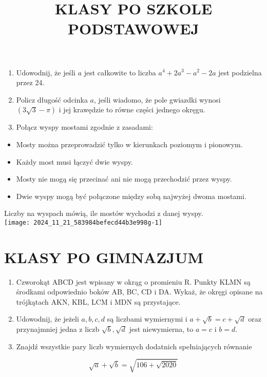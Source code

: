 \documentclass[10pt]{article}
\title{KLASY PO SZKOLE PODSTAWOWEJ }
\author{}
\date{}
\begin{document}
\maketitle
\begin{enumerate}
  \item Udowodnij, że jeśli \(a\) jest całkowite to liczba \(a^{4}+2 a^{3}-a^{2}-2 a\) jest podzielna przez 24.
  \item Policz długość odcinka \(a\), jeśli wiadomo, że pole gwiazdki wynosi \((3 \sqrt{3}-\pi)\) i jej krawędzie to równe części jednego okręgu.
  \item Połącz wyspy mostami zgodnie z zasadami:
\end{enumerate}

\begin{itemize}
  \item Mosty można przeprowadzić tylko w kierunkach poziomym i pionowym.
  \item Każdy most musi łączyć dwie wyspy.
  \item Mosty nie mogą się przecinać ani nie mogą przechodzić przez wyspy.
  \item Dwie wyspy mogą być połączone między sobą najwyżej dwoma mostami.
\end{itemize}

Liczby na wyspach mówią, ile mostów wychodzi z danej wyspy.\\
\texttt{[image: 2024\_11\_21\_583984befecd44b3e998g-1]}

\section*{KLASY PO GIMNAZJUM}
\begin{enumerate}
  \item Czworokąt ABCD jest wpisany w okrąg o promieniu R. Punkty KLMN są środkami odpowiednio boków AB, BC, CD i DA. Wykaż, że okręgi opisane na trójkątach AKN, KBL, LCM i MDN są przystające.
  \item Udowodnij, że jeżeli \(a, b, c, d\) są liczbami wymiernymi i \(a+\sqrt{b}=c+\sqrt{d}\) oraz przynajmniej jedna z liczb \(\sqrt{b}, \sqrt{d}\) jest niewymierna, to \(a=c\) i \(b=d\).
  \item Znajdź wszystkie pary liczb wymiernych dodatnich spełniających równanie
\end{enumerate}

\[
\sqrt{a}+\sqrt{b}=\sqrt{106+\sqrt{2020}}
\]
\end{document}
